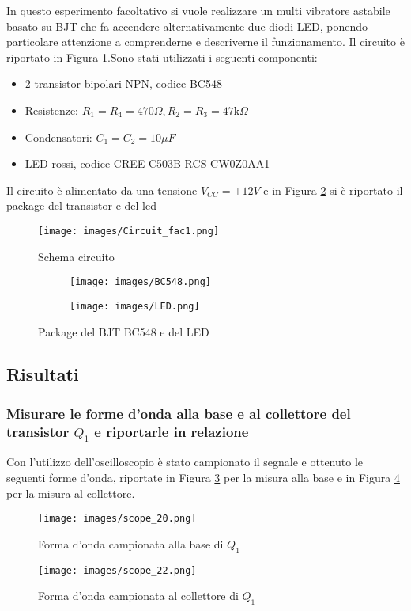 In questo esperimento facoltativo si vuole realizzare un multi vibratore astabile basato su BJT che fa accendere alternativamente due diodi LED, ponendo particolare attenzione a comprenderne e descriverne il funzionamento. Il circuito è riportato in Figura \ref{fig:Circuit_fac}.Sono stati utilizzati i seguenti componenti:
\begin{itemize}
    \item 2 transistor bipolari NPN, codice BC548
    \item Resistenze: $R_1=R_4=470\Omega,R_2=R_3=47\text{k}\Omega$ 
    \item Condensatori: $C_1=C_2=10\mu F$
    \item LED rossi, codice CREE C503B-RCS-CW0Z0AA1
\end{itemize}
Il circuito è alimentato da una tensione $V_{CC}=+12V$ e in Figura \ref{fig:Package3} si è riportato il package del transistor e del led
\begin{figure}[H]
    \centering
    \texttt{[image: images/Circuit\_fac1.png]}
    \caption{Schema circuito}
    \label{fig:Circuit_fac}
\end{figure}
\begin{figure}[H]
    \centering
    \begin{subfigure}{.5\textwidth}
      \centering
      \texttt{[image: images/BC548.png]}
    \end{subfigure}%
    \begin{subfigure}{.5\textwidth}
      \centering
      \texttt{[image: images/LED.png]}
    \end{subfigure}
    \caption{Package del BJT BC548 e del LED}
    \label{fig:Package3}
\end{figure}

\subsection{Risultati}
\subsubsection*{Misurare le forme d’onda alla base e al collettore del transistor $Q_1$ e riportarle in relazione}
Con l'utilizzo dell'oscilloscopio è stato campionato il segnale e  ottenuto le seguenti forme d'onda, riportate in Figura \ref{fig:FacBaseQ1} per la misura alla base e in Figura \ref{fig:FacCollectorQ1} per la misura al collettore.
\begin{figure}[H]
    \centering
    \texttt{[image: images/scope\_20.png]}
    \caption{Forma d'onda campionata alla base di $Q_1$}
    \label{fig:FacBaseQ1}
\end{figure}
\begin{figure}[H]
    \centering
    \texttt{[image: images/scope\_22.png]}
    \caption{Forma d'onda campionata al collettore di $Q_1$}
    \label{fig:FacCollectorQ1}
\end{figure}
